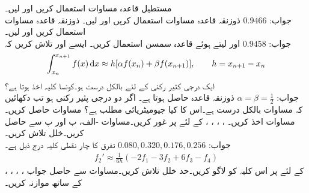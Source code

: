 \quad
مستطیل قاعدہ مساوات  استعمال کریں اور  لیں۔\\
جواب:\quad
$\num{0.9466}$
\quad
ذوزنقہ قاعدہ مساوات  استعمال کریں اور  لیں۔
\quad
ذوزنقہ قاعدہ مساوات  استعمال کریں اور  لیں۔\\
جواب:\quad
$\num{0.9458}$
\quad
{} اور  لیتے ہوئے قاعدہ سمسن  استعمال کریں۔
\quad
ایسے  اور  تلاش کریں کہ 
\begin{align*}
\int_{x_n}^{x_{n+1}}f(x)\dif x\approx h[\alpha f(x_n)+\beta f(x_{n+1})],\quad \quad h=x_{n+1}-x_n
\end{align*}
ایک درجی کثیر رکنی کے لئے بالکل درست ہو۔کونسا کلیہ اخذ ہوتا ہے؟\\
جواب:\quad
$\alpha=\beta=\tfrac{1}{2}$
ذوزنقہ قاعدہ حاصل ہوتا ہے۔
\quad
اگر  دو درجی پثیر رکنی ہو تب دکھائیں کہ مساوات  بالکل درست ہے۔اس کا کیا جیومیٹریائی مطلب ہے؟  
\quad
مساوات  حاصل کریں۔
\quad
مساوات  اخذ کریں۔
\quad
{}، ، ، ،  کے لئے  پر غور کریں۔مساوات -الف، ب اور پ سے  حاصل کریں۔خلل تلاش کریں۔\\
جواب:\quad
$0.080,0.320,0.176,0.256$
\quad
تفرق کا چار نقطی کلیہ درج ذیل ہے۔
\begin{align*}
f_2'\approx \frac{1}{6h}(-2f_1-3f_2+6f_3-f_4)
\end{align*}
، ، ، ،  کے لئے  پر اس کلیہ کو لاگو کریں۔حد خلل تلاش کریں۔مساوات  سے حاصل جواب کے ساتھ موازنہ کریں۔
\quad
